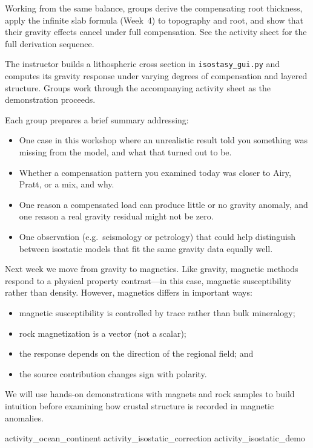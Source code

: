 
Working from the same balance, groups derive the compensating root thickness, apply the infinite slab formula (Week~4) to topography and root, and show that their gravity effects cancel under full compensation. See the activity sheet for the full derivation sequence.


The instructor builds a lithospheric cross section in \texttt{isostasy\_gui.py} and computes its gravity response under varying degrees of compensation and layered structure. Groups work through the accompanying activity sheet as the demonstration proceeds.


Each group prepares a brief summary addressing:
\begin{itemize}
    \item One case in this workshop where an unrealistic result told you something was missing from the model, and what that turned out to be.
    \item Whether a compensation pattern you examined today was closer to Airy, Pratt, or a mix, and why.
    \item One reason a compensated load can produce little or no gravity anomaly, and one reason a real gravity residual might not be zero.
    \item One observation (e.g.\ seismology or petrology) that could help distinguish between isostatic models that fit the same gravity data equally well.
\end{itemize}


Next week we move from gravity to magnetics. Like gravity, magnetic methods respond to a physical property contrast---in this case, magnetic susceptibility rather than density. However, magnetics differs in important ways:
\begin{itemize}
    \item magnetic susceptibility is controlled by trace rather than bulk mineralogy;
    \item rock magnetization is a vector (not a scalar);
    \item the response depends on the direction of the regional field; and
    \item the source contribution changes sign with polarity.
\end{itemize}
We will use hands-on demonstrations with magnets and rock samples to build intuition before examining how crustal structure is recorded in magnetic anomalies.

\workshopend
\notepage
\notepage

{activity_ocean_continent}
{activity_isostatic_correction}
{activity_isostatic_demo}